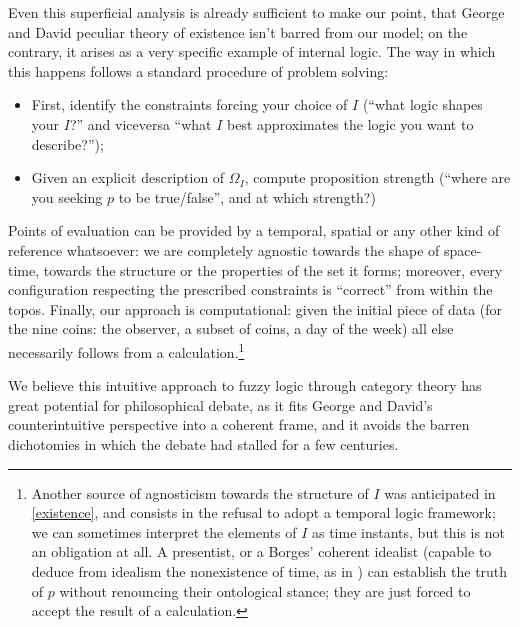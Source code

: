 Even this superficial analysis is already sufficient to make our point, that George and David peculiar theory of existence isn't barred from our model; on the contrary, it arises as a very specific example of internal logic. The way in which this happens follows a standard procedure of problem solving:
\begin{itemize}
	\item First, identify the constraints forcing your choice of $I$ (``what logic shapes your $I$?'' and viceversa ``what $I$ best approximates the logic you want to describe?'');
	\item Given an explicit description of $\Omega_I$, compute proposition strength (``where are you seeking $p$ to be true/false'', and at which strength?)
\end{itemize}
Points of evaluation can be provided by a temporal, spatial or any other kind of reference whatsoever: we are completely agnostic towards the shape of space-time, towards the structure or the properties of the set it forms; moreover, every configuration respecting the prescribed constraints is ``correct'' from within the topos. Finally, our approach is computational: given the initial piece of data (for the nine coins: the observer, a subset of coins, a day of the week) all else necessarily follows from a calculation.\footnote{Another source of agnosticism towards the structure of $I$ was anticipated in \autoref{existence}, and consists in the refusal to adopt a temporal logic framework; we can sometimes interpret the elements of $I$ as time instants, but this is not an obligation at all. A presentist, or a Borges' coherent idealist (capable to deduce from idealism the nonexistence of time, as in \cite{confutacion}) can establish the truth of $p$ without renouncing their ontological stance; they are just forced to accept the result of a calculation.}

We believe this intuitive approach to fuzzy logic through category theory has great potential for philosophical debate, as it fits George and David's counterintuitive perspective into a coherent frame, and it avoids the barren dichotomies in which the debate had stalled for a few centuries.




